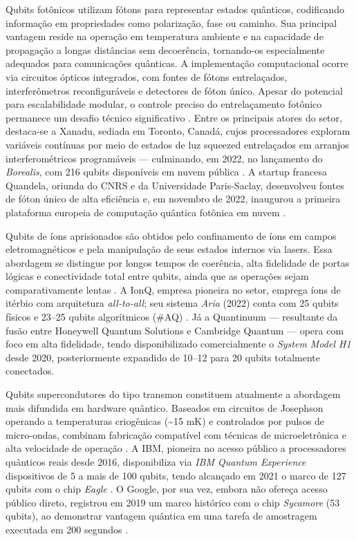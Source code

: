 Qubits fotônicos utilizam fótons para representar estados quânticos, codificando informação em propriedades como polarização, fase ou caminho. Sua principal vantagem reside na operação em temperatura ambiente e na capacidade de propagação a longas distâncias sem decoerência, tornando-os especialmente adequados para comunicações quânticas. A implementação computacional ocorre via circuitos ópticos integrados, com fontes de fótons entrelaçados, interferômetros reconfiguráveis e detectores de fóton único. Apesar do potencial para escalabilidade modular, o controle preciso do entrelaçamento fotônico permanece um desafio técnico significativo \cite{slussarenko2019photonic}. Entre os principais atores do setor, destaca-se a Xanadu, sediada em Toronto, Canadá, cujos processadores exploram variáveis contínuas por meio de estados de luz squeezed entrelaçados em arranjos interferométricos programáveis — culminando, em 2022, no lançamento do \textit{Borealis}, com 216 qubits disponíveis em nuvem pública \cite{xanadu2026borealis}. A startup francesa Quandela, oriunda do CNRS e da Universidade Paris-Saclay, desenvolveu fontes de fóton único de alta eficiência e, em novembro de 2022, inaugurou a primeira plataforma europeia de computação quântica fotônica em nuvem \cite{quandela2022european}.

Qubits de íons aprisionados são obtidos pelo confinamento de íons em campos eletromagnéticos e pela manipulação de seus estados internos via lasers. Essa abordagem se distingue por longos tempos de coerência, alta fidelidade de portas lógicas e conectividade total entre qubits, ainda que as operações sejam comparativamente lentas \cite{bruzewicz_trapped-ion_2019}. A IonQ, empresa pioneira no setor, emprega íons de itérbio com arquitetura \textit{all-to-all}; seu sistema \textit{Aria} (2022) conta com 25 qubits físicos e 23–25 qubits algorítmicos (\#AQ) \cite{ionq2022}. Já a Quantinuum — resultante da fusão entre Honeywell Quantum Solutions e Cambridge Quantum — opera com foco em alta fidelidade, tendo disponibilizado comercialmente o \textit{System Model H1} \cite{quantinuum2022} desde 2020, posteriormente expandido de 10–12 para 20 qubits totalmente conectados.

Qubits supercondutores do tipo transmon constituem atualmente a abordagem mais difundida em hardware quântico. Baseados em circuitos de Josephson operando a temperaturas criogênicas (\textasciitilde 15 mK) e controlados por pulsos de micro-ondas, combinam fabricação compatível com técnicas de microeletrônica e alta velocidade de operação \cite{koch2007charge}. A IBM, pioneira no acesso público a processadores quânticos reais desde 2016, disponibiliza via \textit{IBM Quantum Experience} dispositivos de 5 a mais de 100 qubits, tendo alcançado em 2021 o marco de 127 qubits com o chip \textit{Eagle} \cite{ibm2022quantumEagle}. O Google, por sua vez, embora não ofereça acesso público direto, registrou em 2019 um marco histórico com o chip \textit{Sycamore} (53 qubits), ao demonstrar vantagem quântica em uma tarefa de amostragem executada em 200 segundos \cite{arute_quantum_2019}.

